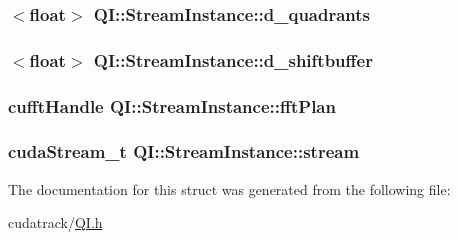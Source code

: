 \subsubsection[{\texorpdfstring{d\+\_\+quadrants}{d_quadrants}}]{$<$float$>$ Q\+I\+::\+Stream\+Instance\+::d\+\_\+quadrants}\hypertarget{struct_q_i_1_1_stream_instance_a39936bfcb1d3852b71dd4e5311d78c34}{}\label{struct_q_i_1_1_stream_instance_a39936bfcb1d3852b71dd4e5311d78c34}
\subsubsection[{\texorpdfstring{d\+\_\+shiftbuffer}{d_shiftbuffer}}]{$<$float$>$ Q\+I\+::\+Stream\+Instance\+::d\+\_\+shiftbuffer}\hypertarget{struct_q_i_1_1_stream_instance_a724cb0eaf4dba31d223c091f24b01a16}{}\label{struct_q_i_1_1_stream_instance_a724cb0eaf4dba31d223c091f24b01a16}
\subsubsection[{\texorpdfstring{fft\+Plan}{fftPlan}}]{\setlength{\rightskip}{0pt plus 5cm}cufft\+Handle Q\+I\+::\+Stream\+Instance\+::fft\+Plan}\hypertarget{struct_q_i_1_1_stream_instance_acef1717596e0bd4e736707949d1e7d10}{}\label{struct_q_i_1_1_stream_instance_acef1717596e0bd4e736707949d1e7d10}
\subsubsection[{\texorpdfstring{stream}{stream}}]{\setlength{\rightskip}{0pt plus 5cm}cuda\+Stream\+\_\+t Q\+I\+::\+Stream\+Instance\+::stream}\hypertarget{struct_q_i_1_1_stream_instance_a86a26550ce70d9da353d52c3d8945918}{}\label{struct_q_i_1_1_stream_instance_a86a26550ce70d9da353d52c3d8945918}


The documentation for this struct was generated from the following file\+:\begin{DoxyCompactItemize}
\item 
cudatrack/\hyperlink{_q_i_8h}{Q\+I.\+h}\end{DoxyCompactItemize}
